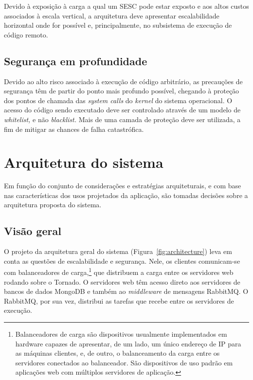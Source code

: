 \documentclass[ruledheader, 12pt]{abnt}
\newcommand{\figref}[1]{(Figura~\ref{fig:#1})}
\begin{document}
Devido à exposição à carga a qual um SESC pode estar exposto e aos altos custos associados à escala vertical, a arquitetura deve apresentar escalabilidade horizontal onde for possível e, principalmente, no subsistema de execução de código remoto.

\subsection{Segurança em profundidade}

Devido ao alto risco associado à execução de código arbitrário, as precauções de segurança têm de partir do ponto mais profundo possível, chegando à proteção dos pontos de chamada das \emph{system calls} do \emph{kernel} do sistema operacional. O acesso do código sendo executado deve ser controlado através de um modelo de \emph{whitelist,} e não \emph{blacklist.} Mais de uma camada de proteção deve ser utilizada, a fim de mitigar as chances de falha catastrófica.

\clearpage
\section{Arquitetura do sistema}

Em função do conjunto de considerações e estratégias arquiteturais, e com base nas características dos usos projetados da aplicação, são tomadas decisões sobre a arquitetura proposta do sistema.

\subsection{Visão geral}

O projeto da arquitetura geral do sistema \figref{architecture} leva em conta as questões de escalabilidade e segurança. Nele, os clientes comunicam-se com balanceadores de carga,\footnote{Balanceadores de carga são dispositivos usualmente implementados em hardware capazes de apresentar, de um lado, um único endereço de IP para as máquinas clientes, e, de outro, o balanceamento da carga entre os servidores conectados ao balanceador. São dispositivos de uso padrão em aplicações web com múltiplos servidores de aplicação.} que distribuem a carga entre os servidores web rodando sobre o Tornado. O servidores web têm acesso direto aos servidores de bancos de dados MongoDB e também ao \emph{middleware} de mensagens RabbitMQ. O RabbitMQ, por sua vez, distribui as tarefas que recebe entre os servidores de execução.
\end{document}
